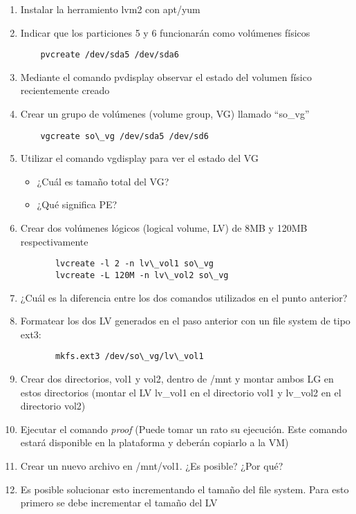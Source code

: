 \begin{enumerate}
 \item Instalar la herramiento lvm2 con apt/yum
 \item Indicar que los particiones 5 y 6 funcionarán como volúmenes físicos
  \begin{verbatim}
    pvcreate /dev/sda5 /dev/sda6
  \end{verbatim}
 \item Mediante el comando pvdisplay observar el estado del volumen físico recientemente creado
 \item Crear un grupo de volúmenes (volume group, VG) llamado “so\_vg”
  \begin{verbatim}
    vgcreate so\_vg /dev/sda5 /dev/sd6
  \end{verbatim}
 \item Utilizar el comando vgdisplay para ver el estado del VG
 \begin{itemize} 
  \item ¿Cuál es tamaño total del VG?
  \item ¿Qué significa PE?
 \end{itemize}
 \item Crear dos volúmenes lógicos (logical volume, LV) de 8MB y 120MB respectivamente
  \begin{verbatim}
       lvcreate -l 2 -n lv\_vol1 so\_vg
       lvcreate -L 120M -n lv\_vol2 so\_vg
  \end{verbatim}
 \item ¿Cuál es la diferencia entre los dos comandos utilizados en el punto anterior?
 \item Formatear los dos LV generados en el paso anterior con un file system de tipo ext3:
   \begin{verbatim}
       mkfs.ext3 /dev/so\_vg/lv\_vol1
   \end{verbatim}
 \item Crear dos directorios, vol1 y vol2, dentro de /mnt y montar ambos LG en estos directorios (montar el LV lv\_vol1 en el 
   directorio vol1 y lv\_vol2 en el directorio vol2)
 \item Ejecutar el comando {\it proof} (Puede tomar un rato su ejecución. Este comando estará disponible en la plataforma y deberán
   copiarlo a la VM)
 \item Crear un nuevo archivo en /mnt/vol1. ¿Es posible? ¿Por qué?
 \item Es posible solucionar esto incrementando el tamaño del file system. Para esto primero se debe incrementar el tamaño del LV

\end{enumerate}
